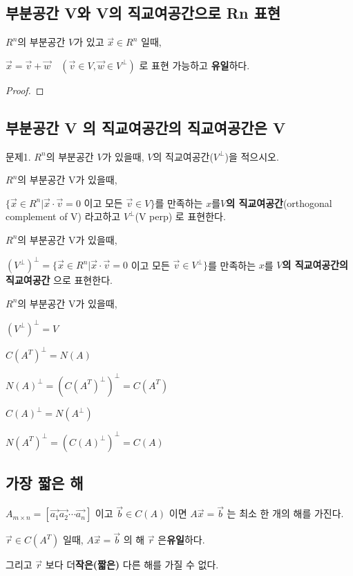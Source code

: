 \newpage
\subsection{부분공간 V와 V의 직교여공간으로 Rn 표현}
\begin{theorem}
$R^n$의 부분공간 $V$가 있고 $\vec{x} \in R^n$ 일때,

$\vec{x} = \vec{v} + \vec{w} \quad (\vec{v} \in V, \vec{w} \in V^{\perp})$  로 표현 가능하고 \textbf{유일}하다.
\end{theorem}
\begin{proof}
\end{proof}

\newpage
\subsection{부분공간 V 의 직교여공간의 직교여공간은 V}
문제1. $R^n$의 부분공간 $V$가 있을때, $V$의 직교여공간($V^\perp$)을 적으시오.

\newpage
\begin{definition}
$R^n$의 부분공간 V가 있을때, 

$\{\vec{x} \in R^n | \vec{x}\cdot \vec{v} = 0$ 이고 모든 $\vec{v} \in V \}$를 만족하는 $x$를\textbf{$V$의 직교여공간}(orthogonal complement of V) 라고하고 $V^\perp$(V perp) 로 표현한다.
\end{definition}

\begin{definition} 
$R^n$의 부분공간 V가 있을때, 

$(V^\perp)^\perp = \{\vec{x} \in R^n | \vec{x}\cdot \vec{v} = 0$ 이고 모든 $\vec{v} \in V^\perp \}$를 만족하는 $x$를 \textbf{$V$의 직교여공간의 직교여공간} 으로 표현한다.
\end{definition}

\begin{theorem}
$R^n$의 부분공간 V가 있을때, 

$(V^\perp)^\perp = V$
\end{theorem}


\begin{theorem}
$C(A^{T})^{\perp} = N(A)$

$N(A)^{\perp} = (C(A^T)^{\perp})^{\perp} = C(A^T)$

$C(A)^{\perp} = N(A^{\perp})$

$N(A^T)^{\perp} = (C(A)^{\perp})^{\perp} = C(A)$
\end{theorem}

\newpage
\subsection{가장 짧은 해}
\begin{theorem}
$A_{m \times n} = [ \vec{a_1} \vec{a_2} \cdots \vec{a_n}]$ 이고 $\vec{b} \in C(A)$ 이면 $A\vec{x} = \vec{b}$ 는 최소 한 개의 해를 가진다.

$\vec{r} \in C(A^T)$ 일때, $A\vec{x}  = \vec{b}$ 의 해 $\vec{r}$ 은\textbf{유일}하다.

그리고 $\vec{r}$ 보다 더\textbf{작은(짧은)} 다른 해를 가질 수 없다.
\end{theorem}

